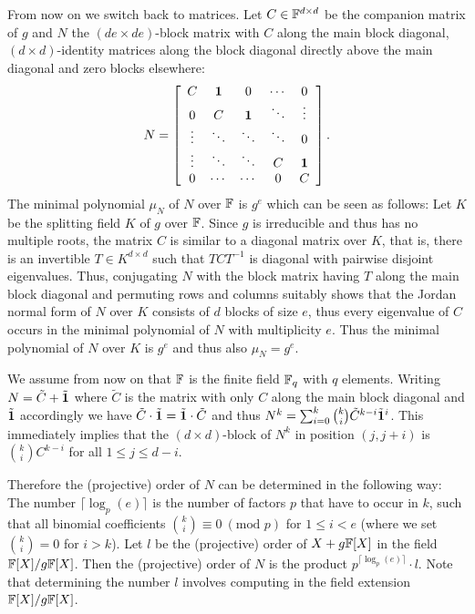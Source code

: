 From now on we switch back to matrices. Let $C \in \mathbb{F}^{d \times d}$ be 
the companion matrix of $g$ and $N$ the $(de \times de)$-block matrix with 
$C$ along the main block diagonal, $(d \times d)$-identity matrices
along the block diagonal directly above the main diagonal and zero blocks
elsewhere:
\[ N = \left[ \begin{array}{ccccc}
    C      & \mathbf{1}   & 0      & \cdots & 0 \\
    0      & C      & \mathbf{1}   & \ddots & \vdots \\
    \vdots & \ddots & \ddots & \ddots & 0 \\
    \vdots & \ddots & \ddots & C      & \mathbf{1} \\
    0      & \cdots & \cdots & 0      & C
\end{array} \right]. \]
The minimal polynomial $\mu_N$ of $N$ over $\mathbb{F}$ is $g^e$ 
which can be seen as follows:
Let $K$ be the splitting field $K$ of $g$ over $\mathbb{F}$. Since $g$ is
irreducible and thus has no multiple roots, the 
matrix $C$ is similar to a diagonal matrix over $K$, that is, there is an
invertible $T \in K^{d \times d}$ such that $TCT^{-1}$ is diagonal
with pairwise disjoint eigenvalues.
Thus, conjugating $N$ with the block matrix having $T$ along the
main block diagonal and permuting rows and columns suitably shows that
the Jordan normal form of $N$ over $K$ consists of $d$ blocks of
size $e$, thus every eigenvalue of $C$ occurs in the minimal
polynomial of $N$ with multiplicity $e$. Thus the minimal polynomial
of $N$ over $K$ is $g^e$ and thus also $\mu_N = g^e$.

We assume from now on that $\mathbb{F}$ is the finite field $\mathbb{F}_q$ with $q$
elements.
Writing $N = \tilde C + \tilde {\mathbf{1}}$ where $\tilde C$ is the matrix
with only $C$ along the main block diagonal and $\tilde {\mathbf{1}}$
accordingly we have $\tilde C \cdot \tilde {\mathbf{1}} = \tilde {\mathbf{1}} \cdot \tilde C$
and thus $N^k = \sum_{i=0}^k {k \choose i} \tilde C^{k-i} \tilde
{\mathbf{1}}^i$. This immediately implies that the $(d \times d)$-block
of $N^k$ in position $(j,j+i)$ is ${k \choose i}C^{k-i}$ for all
$1 \le j \le d-i$. 

Therefore the (projective) order of $N$ can be determined in the
following way: The number $\lceil \log_p(e)\rceil$ is the number
of factors $p$ that have to occur in $k$, such that all binomial
coefficients ${k \choose i} \equiv 0 \ (\mbox{mod } p)$ for $1 \le i < e$ 
(where we set ${k
\choose i} = 0$ for $i > k$). Let $l$ be the (projective) order of
$X+g\mathbb{F}[X]$ in the field $\mathbb{F}[X]/g\mathbb{F}[X]$. Then the (projective) order of
$N$ is the product $p^{\lceil \log_p(e) \rceil} \cdot l$. Note that
determining the number $l$ involves computing in the field extension
$\mathbb{F}[X]/g\mathbb{F}[X]$.

